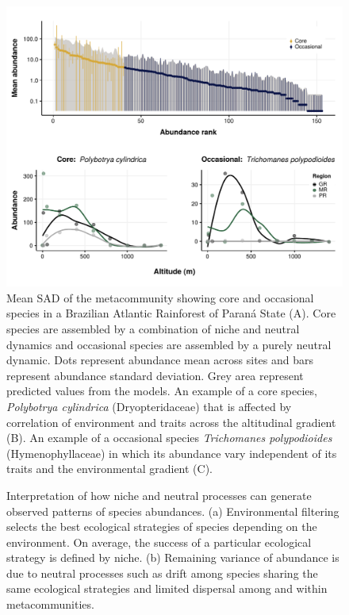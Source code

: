 \documentclass[12pt]{article}
\begin{document}
\begin{figure}[!h]
 \begin{center}
\includegraphics[scale=.75]{./fig/rad_mettacomunity.pdf}
\end{center}
\caption{Mean SAD of the metacommunity showing core and occasional species in a Brazilian Atlantic Rainforest of Paran\'a State (A). Core species are assembled by a combination of niche and neutral dynamics and occasional species are assembled by a purely neutral dynamic. Dots represent abundance mean across sites and bars represent abundance standard deviation. Grey area represent predicted values from the models. An example of a core species, \emph{Polybotrya cylindrica} (Dryopteridaceae) that is affected by correlation of environment and traits across the altitudinal gradient (B). An example of a occasional species \emph{Trichomanes polypodioides} (Hymenophyllaceae) in which its abundance vary independent of its traits and the environmental gradient (C). \label{rad}}
\end{figure}

\begin{figure}[!ht]
 \begin{center}
\end{center}
\caption{Interpretation of how niche and neutral processes can generate observed patterns of species abundances. (a) Environmental filtering selects the best ecological strategies of species depending on the environment. On average, the success of a particular ecological strategy is defined by niche. (b) Remaining variance of abundance is due to neutral processes such as drift among species sharing the same ecological strategies and limited dispersal among and within metacommunities.} \label{final}
\end{figure}



\end{document}

